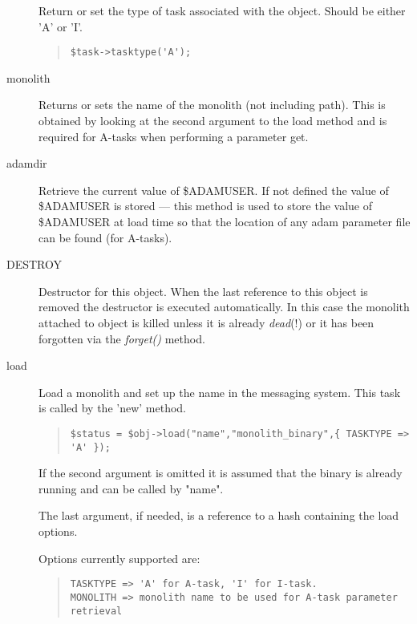 \documentclass[twoside,11pt]{article}
\newenvironment{myquote}{\begin{quote}\begin{small}}{\end{small}\end{quote}}
\renewcommand{\_}{\texttt{\symbol{95}}}
\begin{document}
\begin{description}
Return or set the type of task associated with the object.
Should be either 'A' or 'I'.
\begin{myquote}
\begin{verbatim}
$task->tasktype('A');
\end{verbatim}
\end{myquote}  %

\item[monolith] \mbox{}

Returns or sets the name of the monolith (not including path).
This is obtained by looking at the second argument to the
load method and is required for A-tasks when performing a parameter
get.

\item[adamdir] \mbox{}

Retrieve the current value of \$ADAM\_{}USER. If not defined the
value of \$ADAM\_{}USER is stored --- this method is used to store the
value of \$ADAM\_{}USER at load time so that the location of any
adam parameter file can be found (for A-tasks).

\item[DESTROY] \mbox{}

Destructor for this object. When the last reference to this
object is removed the destructor is executed automatically.
In this case the monolith attached to object is killed
unless it is already {\em dead\/}(!) or it has been forgotten
via the {\em forget()\/} method.

\item[load] \mbox{}

Load a monolith and set up the name in the messaging system.
This task is called by the 'new' method.
\begin{myquote}
\begin{verbatim}
$status = $obj->load("name","monolith_binary",{ TASKTYPE => 'A' });
\end{verbatim}
\end{myquote}

If the second argument is omitted it is assumed that the binary
is already running and can be called by "name".

The last argument, if needed, is a reference to a hash containing
the load options.

Options currently supported are:
\begin{myquote}
\begin{verbatim}
TASKTYPE => 'A' for A-task, 'I' for I-task.
MONOLITH => monolith name to be used for A-task parameter retrieval
\end{verbatim}
\end{myquote}


\end{description}
\end{document}
